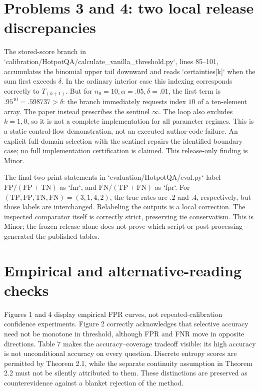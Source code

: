 \documentclass[10pt]{article}
\begin{document}
\section*{Problems 3 and 4: two local release discrepancies}
The stored-score branch in `calibration/HotpotQA/calculate\_vanilla\_threshold.py`, lines 85–101, accumulates the binomial upper tail downward and reads `certainties[k]` when the sum first exceeds \(\delta\). In the ordinary interior case this indexing corresponds correctly to \(T_{(k+1)}\). But for \(n_0=10,\alpha=.05,\delta=.01\), the first term is \(.95^{10}=.598737>\delta\): the branch immediately requests index \(10\) of a ten-element array. The paper instead prescribes the sentinel \(\infty\). The loop also excludes \(k=1,0\), so it is not a complete implementation for all parameter regimes. This is a static control-flow demonstration, not an executed author-code failure. An explicit full-domain selection with the sentinel repairs the identified boundary case; no full implementation certification is claimed. This release-only finding is Minor.\par
The final two print statements in `evaluation/HotpotQA/eval.py` label \(\mathrm{FP}/(\mathrm{FP}+\mathrm{TN})\) as `fnr`, and \(\mathrm{FN}/(\mathrm{TP}+\mathrm{FN})\) as `fpr`. For \((\mathrm{TP},\mathrm{FP},\mathrm{TN},\mathrm{FN})=(3,1,4,2)\), the true rates are \(.2\) and \(.4\), respectively, but those labels are interchanged. Relabeling the outputs is a local correction. The inspected comparator itself is correctly strict, preserving tie conservatism. This is Minor; the frozen release alone does not prove which script or post-processing generated the published tables.\par
\section*{Empirical and alternative-reading checks}
Figures 1 and 4 display empirical FPR curves, not repeated-calibration confidence experiments. Figure 2 correctly acknowledges that selective accuracy need not be monotone in threshold, although FPR and FNR move in opposite directions. Table 7 makes the accuracy–coverage tradeoff visible: its high accuracy is not unconditional accuracy on every question. Discrete entropy scores are permitted by Theorem 2.1, while the separate continuity assumption in Theorem 2.2 must not be silently attributed to them. These distinctions are preserved as counterevidence against a blanket rejection of the method.\par
\end{document}
